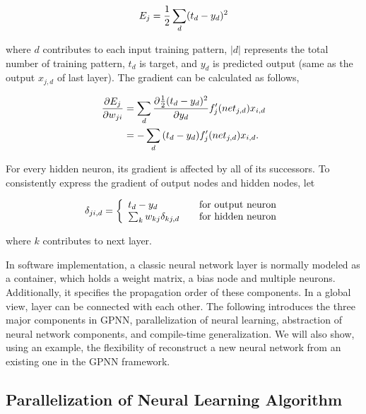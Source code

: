 \documentclass[procedia]{easychair}
\begin{document}
\begin{equation}
    E_j = \frac{1}{2} \sum_d ( t_d - y_d ) ^ 2 \notag
\end{equation}

where $d$ contributes to each input training pattern, $|d|$ represents the total number of training pattern, $t_d$ is target, and $y_d$ is predicted output (same as the output $x_{j,d}$ of last layer).  The gradient can be calculated as follows,

\begin{align}
    \frac{ \partial E_j }{ \partial w_{ji} } & = \sum_d { \frac{ \partial { \frac{1}{2} ( t_d - y_d )^2 } }{ \partial y_d } f'_j ( net_{j,d} ) x_{i,d} } \notag \\
    & = - \sum_d { ( t_d - y_d ) f'_j ( net_{j,d} ) x_{i,d} } \text{.} \notag
\end{align}

For every hidden neuron, its gradient is affected by all of its successors.  To consistently express the gradient of output nodes and hidden nodes, let

\begin{equation}
    \delta_{ji,d} = \left \{
    \begin{array}{l l}
        t_d - y_d & \quad \text{for output neuron} \\
        \sum_k {w_{kj}\delta_{kj,d} } & \quad \text{for hidden neuron}
    \end{array} \right. \notag
\end{equation}

where $k$ contributes to next layer.

In software implementation, a classic neural network layer is normally modeled as a container, which holds a weight matrix, a bias node and multiple neurons.  Additionally, it specifies the propagation order of these components.  In a global view, layer can be connected with each other.
The following introduces the three major components in GPNN, parallelization of neural learning, abstraction of neural network components, and compile-time generalization.  We will also show, using an example, the flexibility of reconstruct a new neural network from an existing one in the GPNN framework.

\subsection{Parallelization of Neural Learning Algorithm}
\end{document}
